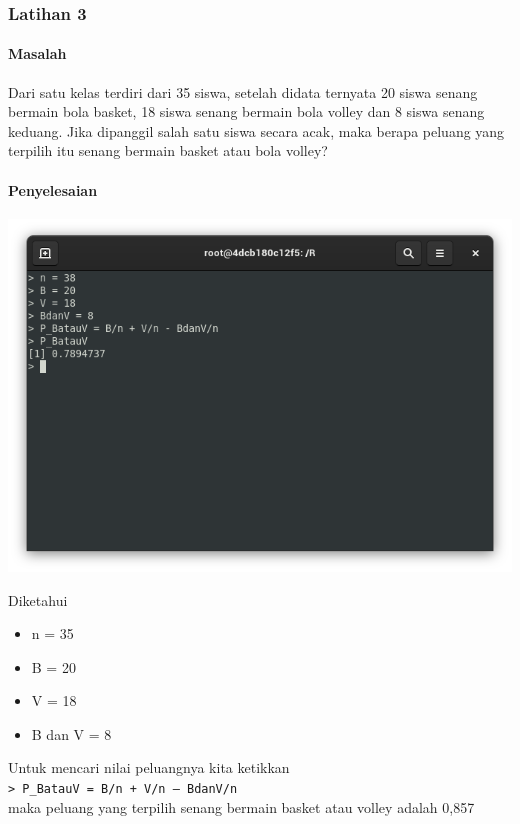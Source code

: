 \documentclass[a4paper,12pt]{article}
\begin{document}
\subsubsection{Latihan 3}
\paragraph{Masalah\\}
Dari satu kelas terdiri dari 35 siswa, setelah didata ternyata 20 siswa senang bermain bola basket, 18 siswa senang bermain bola volley dan 8 siswa senang keduang. Jika dipanggil salah satu siswa secara acak, maka berapa peluang yang terpilih itu senang bermain basket atau bola volley?
\paragraph{Penyelesaian\\}
\begin{center}
	\includegraphics[scale=.5]{lat3}
\end{center}

Diketahui 
\begin{itemize}
	\item n = 35 
	\item B = 20
	\item V = 18
	\item B dan V = 8
\end{itemize}
Untuk mencari nilai peluangnya kita ketikkan\\ 
\texttt{> P\_BatauV = B/n + V/n – BdanV/n}\\ 
maka peluang yang terpilih senang bermain basket atau volley adalah 0,857
\end{document}
